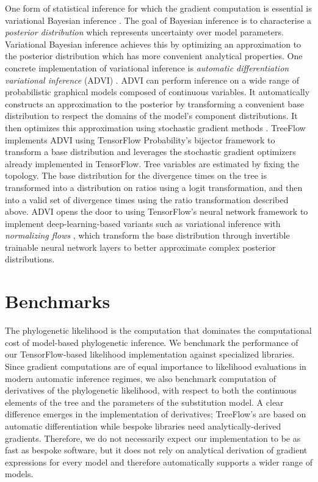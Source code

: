 One form of statistical inference for which the gradient computation is essential is variational Bayesian inference \cite{jordan1999introduction}. The goal of Bayesian inference is to characterise a \textit{posterior distribution} which represents uncertainty over model parameters. Variational Bayesian inference achieves this by optimizing an approximation to the posterior distribution which has more convenient analytical properties. One concrete implementation of variational inference is \textit{automatic differentiation variational inference} (ADVI) \cite{kucukelbir2017automatic}. ADVI can perform inference on a wide range of probabilistic graphical models composed of continuous variables. It automatically constructs an approximation to the posterior by transforming a convenient base distribution to respect the domains of the model's component distributions. It then optimizes this approximation using stochastic gradient methods \cite{robbins1951stochastic, bottou2010large}. TreeFlow implements ADVI using TensorFlow Probability's bijector framework to transform a base distribution and leverages the stochastic gradient optimizers already implemented in TensorFlow. Tree variables are estimated by fixing the topology. The base distribution for the divergence times on the tree is transformed into a distribution on ratios using a logit transformation, and then into a valid set of divergence times using the ratio transformation described above. ADVI opens the door to using TensorFlow's neural network framework to implement deep-learning-based variants such as variational inference with \textit{normalizing flows} \cite{rezende2015variational}, which transform the base distribution through invertible trainable neural network layers to better approximate complex posterior distributions.

\section{Benchmarks}

The phylogenetic likelihood is the computation that dominates the computational cost of model-based phylogenetic inference. We benchmark the performance of our TensorFlow-based likelihood implementation against specialized libraries. Since gradient computations are of equal importance to likelihood evaluations in modern automatic inference regimes, we also benchmark computation of derivatives of the phylogenetic likelihood, with respect to both the continuous elements of the tree and the parameters of the substitution model. A clear difference emerges in the implementation of derivatives; TreeFlow's are based on automatic differentiation while bespoke libraries need analytically-derived gradients. Therefore, we do not necessarily expect our implementation to be as fast as bespoke software, but it does not rely on analytical derivation of gradient expressions for every model and therefore automatically supports a wider range of models.

